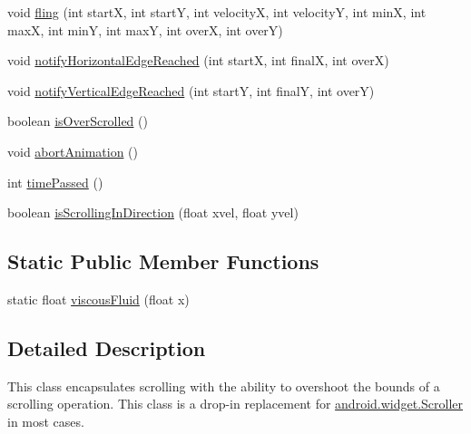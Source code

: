 \begin{DoxyCompactItemize}
\item 
void \hyperlink{classit_1_1sephiroth_1_1android_1_1library_1_1widget_1_1_over_scroller_ad9fb62c5f9c44a97e096cdfc6240825a}{fling} (int startX, int startY, int velocityX, int velocityY, int minX, int maxX, int minY, int maxY, int overX, int overY)
\item 
void \hyperlink{classit_1_1sephiroth_1_1android_1_1library_1_1widget_1_1_over_scroller_a928e6f44278dffe0d91a3aeec6b5c199}{notify\+Horizontal\+Edge\+Reached} (int startX, int finalX, int overX)
\item 
void \hyperlink{classit_1_1sephiroth_1_1android_1_1library_1_1widget_1_1_over_scroller_aadd11462ad1243bb8b582931a59df5be}{notify\+Vertical\+Edge\+Reached} (int startY, int finalY, int overY)
\item 
boolean \hyperlink{classit_1_1sephiroth_1_1android_1_1library_1_1widget_1_1_over_scroller_a9640d5424408bf74c872ac7502816137}{is\+Over\+Scrolled} ()
\item 
void \hyperlink{classit_1_1sephiroth_1_1android_1_1library_1_1widget_1_1_over_scroller_afd65ddc97c8b8c2b2fbafd73e3cff65e}{abort\+Animation} ()
\item 
int \hyperlink{classit_1_1sephiroth_1_1android_1_1library_1_1widget_1_1_over_scroller_a73f818701cfc4c4c1cc35a2970ffac23}{time\+Passed} ()
\item 
boolean \hyperlink{classit_1_1sephiroth_1_1android_1_1library_1_1widget_1_1_over_scroller_a3e809e8269caa1cd9d8e674a51840f00}{is\+Scrolling\+In\+Direction} (float xvel, float yvel)
\end{DoxyCompactItemize}
\subsection*{Static Public Member Functions}
\begin{DoxyCompactItemize}
\item 
static float \hyperlink{classit_1_1sephiroth_1_1android_1_1library_1_1widget_1_1_over_scroller_a900465936db827bcf335faa2cefcb34a}{viscous\+Fluid} (float x)
\end{DoxyCompactItemize}


\subsection{Detailed Description}
This class encapsulates scrolling with the ability to overshoot the bounds of a scrolling operation. This class is a drop-\/in replacement for \hyperlink{}{android.\+widget.\+Scroller} in most cases. 

